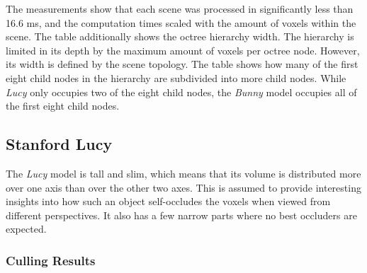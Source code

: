 \noindent
The measurements show that each scene was processed in significantly less than 16.6 ms, and the 
computation times scaled with the amount of voxels within the scene. The table additionally shows 
the octree hierarchy width. The hierarchy is limited in its depth by the maximum amount of voxels 
per octree node. However, its width is defined by the scene topology. The table shows how many of 
the first eight child nodes in the hierarchy are subdivided into more child nodes. While \emph{Lucy} 
only occupies two of the eight child nodes, the \emph{Bunny} model occupies all of the first eight 
child nodes.


\subsection*{Stanford Lucy}

The \emph{Lucy} model is tall and slim, which means that its volume is distributed more over one axis 
than over the other two axes. This is assumed to provide interesting insights into how such an object 
self-occludes the voxels when viewed from different perspectives. It also has a few narrow parts where 
no best occluders are expected.


\subsubsection*{Culling Results} \label{subsubsec-culling-results-lucy}



